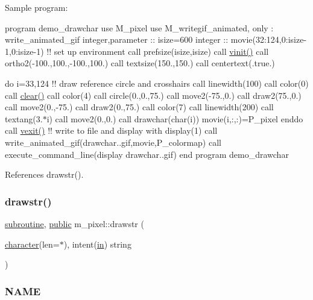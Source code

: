 Sample program\+:

program demo\+\_\+drawchar use M\+\_\+pixel use M\+\_\+writegif\+\_\+animated, only \+: write\+\_\+animated\+\_\+gif integer,parameter \+:\+: isize=600 integer \+:\+: movie(32\+:124,0\+:isize-\/1,0\+:isize-\/1) !! set up environment call prefsize(isize,isize) call \hyperlink{namespacem__pixel_ac03ca8f23fdadb60599b6ea4dc87a6d9}{vinit()} call ortho2(-\/100.,100.,-\/100.,100.) call textsize(150.,150.) call centertext(.true.)

do i=33,124 !! draw reference circle and crosshairs call linewidth(100) call color(0) call \hyperlink{namespacem__pixel_af3b81a21a0b2f6b5eddd09c031bd6173}{clear()} call color(4) call circle(0.,0.,75.) call move2(-\/75.,0.) call draw2(75.,0.) call move2(0.,-\/75.) call draw2(0.,75.) call color(7) call linewidth(200) call textang(3.$\ast$i) call move2(0.,0.) call drawchar(char(i)) movie(i,\+:,\+:)=P\+\_\+pixel enddo call \hyperlink{namespacem__pixel_a19ad6b65752322b0029a62cc0ebec3e8}{vexit()} !! write to file and display with display(1) call write\+\_\+animated\+\_\+gif(\textquotesingle{}drawchar..\+gif\textquotesingle{},movie,P\+\_\+colormap) call execute\+\_\+command\+\_\+line(\textquotesingle{}display drawchar..\+gif\textquotesingle{}) end program demo\+\_\+drawchar 

References drawstr().

\mbox{\label{namespacem__pixel_a6fa0c2d531d1ac74840aa2f0e2b050e0}} 
\subsubsection{\texorpdfstring{drawstr()}{drawstr()}}
{\footnotesize\ttfamily \hyperlink{M__stopwatch_83_8txt_acfbcff50169d691ff02d4a123ed70482}{subroutine}, \hyperlink{M__stopwatch_83_8txt_a2f74811300c361e53b430611a7d1769f}{public} m\+\_\+pixel\+::drawstr (\begin{DoxyParamCaption}\item[{\hyperlink{option__stopwatch_83_8txt_abd4b21fbbd175834027b5224bfe97e66}{character}(len=$\ast$), intent(\hyperlink{M__journal_83_8txt_afce72651d1eed785a2132bee863b2f38}{in})}]{string }\end{DoxyParamCaption})}



\subsubsection*{N\+A\+ME}

